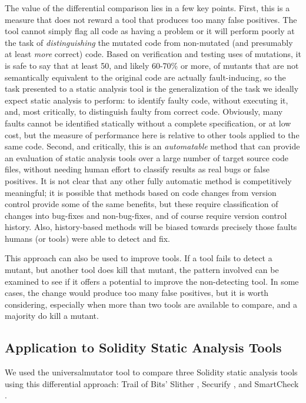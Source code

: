 \documentclass{article}
\begin{document}
The value of the differential comparison lies in a few key points.  First, this is a measure that does not reward a tool that produces too many false positives.  The tool cannot simply flag all code as having a problem or it will perform poorly at the task of \emph{distinguishing} the mutated code from non-mutated (and presumably at least \emph{more} correct) code.  Based on verification and testing uses of mutations, it is safe to say that at least 50, and likely 60-70\% or more, of mutants that are not semantically equivalent to the original code are actually fault-inducing, so the task presented to a static analysis tool is the generalization of the task we ideally expect static analysis to perform:  to identify faulty code, without executing it, and, most critically, to distinguish faulty from correct code.  Obviously, many faults cannot be identified statically without a complete specification, or at low cost, but the measure of performance here is relative to other tools applied to the same code.  Second, and critically, this is an \emph{automatable} method that can provide an evaluation of static analysis tools over a large number of target source code files, without needing human effort to classify results as real bugs or false positives.  It is not clear that any other fully automatic method is competitively meaningful; it is possible that methods based on code changes from version control provide some of the same benefits, but these require classification of changes into bug-fixes and non-bug-fixes, and of course require version control history.  Also, history-based methods will be biased towards precisely those faults humans (or tools) were able to detect and fix.

This approach can also be used to improve tools.  If a tool fails to detect a mutant, but another tool does kill that mutant, the pattern involved can be examined to see if it offers a potential to improve the non-detecting tool.  In some cases, the change would produce too many false positives, but it is worth considering, especially when more than two tools are available to compare, and a majority do kill a mutant.

\subsection{Application to Solidity Static Analysis Tools}

We used the universalmutator tool \cite{universalmutator,regexpMut} to compare three Solidity static analysis tools using this differential approach: Trail of Bits' Slither \cite{slither}, Securify \cite{securify}, and SmartCheck \cite{smartcheck}.
\end{document}
